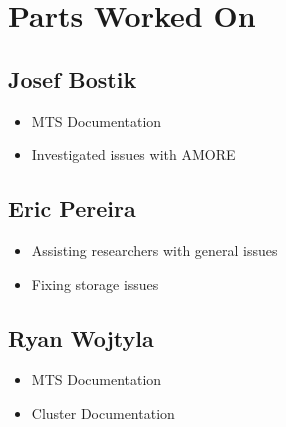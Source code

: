 \documentclass[12pt]{article}
\begin{document}
\section{Parts Worked On}

\subsection{Josef Bostik}

\begin{itemize}
\item MTS Documentation
\item Investigated issues with AMORE
\end{itemize}

\subsection{Eric Pereira}

\begin{itemize}
\item Assisting researchers with general issues
\item Fixing storage issues
\end{itemize}

\subsection{Ryan Wojtyla}

\begin{itemize}
\item MTS Documentation
\item Cluster Documentation 
\end{itemize}


\end{document}
